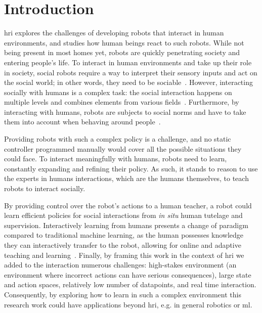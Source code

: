 \chapter{Introduction} \label{chap:intro}
\graphicspath{{images/intro/}}
\glsresetall

\gls{hri} explores the challenges of developing robots that interact in human environments, and studies how human beings react to such robots. While not being present in most homes yet, robots are quickly penetrating society and entering people's life. 
To interact in human environments and take up their role in society, social robots require a way to interpret their sensory inputs and act on the social world; in other words, they need to be sociable~\citep{breazeal2004designing}. However, interacting socially with humans is a complex task: the social interaction happens on multiple levels and combines elements from various fields~\citep{fong2003survey}. Furthermore, by interacting with humans, robots are subjects to social norms and have to take them into account when behaving around people~\citep{bartneck2004design}. 

Providing robots with such a complex policy is a challenge, and no static controller programmed manually would cover all the possible situations they could face. To interact meaningfully with humans, robots need to learn, constantly expanding and refining their policy. As such, it stands to reason to use the experts in humans interactions, which are the humans themselves, to teach robots to interact socially. 

By providing control over the robot's actions to a human teacher, a robot could learn efficient policies for social interactions from \textit{in situ} human tutelage and supervision. Interactively learning from humans presents a change of paradigm compared to traditional machine learning, as the human possesses knowledge they can interactively transfer to the robot, allowing for online and adaptive teaching and learning~\citep{fails2003interactive,amershi2014power}. Finally, by framing this work in the context of \gls{hri} we added to the interaction numerous challenges: high-stakes environment (an environment where incorrect actions can have serious consequences), large state and action spaces, relatively low number of datapoints, and real time interaction. Consequently, by exploring how to learn in such a complex environment this research work could have applications beyond \gls{hri}, e.g. in general robotics or \gls{ml}.

